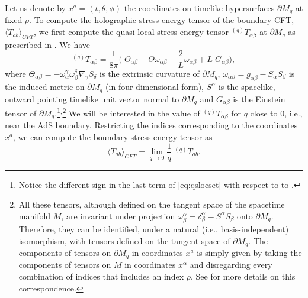\documentclass[a4paper,11pt]{article}
\numberwithin{equation}{section}
\begin{document}
Let us denote by $x^a=(t,\theta,\phi)$ the coordinates on timelike hypersurfaces $\partial M_q$ at fixed $\rho$.
To compute the holographic stress-energy tensor of the boundary CFT, $\langle T_{ab}\rangle_{CFT}$, we first compute the quasi-local stress-energy tensor $^{(q)}T_{\alpha\beta}$ at $\partial M_q$ as prescribed in \cite{Balasubramanian:1999re}. 
We have
\begin{equation}
\label{eq:qslocset}
^{(q)}T_{\alpha\beta}=\frac{1}{8\pi}\biggl(\;   \Theta_{\alpha\beta}-\Theta \omega_{\alpha\beta}-\frac{2}{L}\omega_{\alpha\beta}+L \;G_{\alpha\beta} \biggr),
\end{equation}
where $\Theta_{\alpha\beta}=-\omega^\gamma_{\alpha}\omega^\delta_\beta\nabla_{\gamma}S_{\delta}$ is the extrinsic curvature of $\partial M_q$, $\omega_{\alpha\beta}=g_{\alpha\beta}-S_\alpha S_\beta$ is the induced metric on $\partial M_q$ (in four-dimensional form), $S^\alpha$ is the spacelike, outward pointing timelike unit vector normal to $\partial M_q$ and $G_{\alpha\beta}$ is the Einstein tensor of $\partial M_q$.\footnote{Notice the different sign in the last term of \eqref{eq:qslocset} with respect to to \cite{Balasubramanian:1999re}.}$^{,}$\footnote{All these tensors, although defined on the tangent space of the spacetime manifold $M$, are invariant under projection $\omega^\alpha_{\beta}=\delta^\alpha_{\beta}-S^\alpha S_\beta$ onto $\partial M_q$. Therefore, they can be identified, under a natural (i.e., basis-independent) isomorphism, with tensors defined on the tangent space of $\partial M_q$. The components of tensors on $\partial M_q$ in coordinates $x^a$ is simply given by taking the components of tensors on $M$ in coordinates $x^\alpha$ and disregarding every combination of indices that includes an index $\rho$. See \cite{Hawking:1973uf} for more details on this correspondence.} We will be interested in the value of $^{(q)}T_{\alpha\beta}$ for $q$ close to 0, i.e., near the AdS boundary.
Restricting the indices corresponding to the coordinates $x^a$, we can compute the boundary stress-energy tensor as
\begin{equation}
\langle T_{ab}\rangle_{CFT}=\lim_{q\to0}\frac{1}{q}  \;^{(q)}T_{ab}.
\end{equation}
\end{document}

